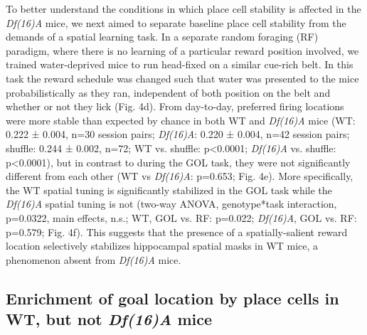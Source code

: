 To better understand the conditions in which place cell stability is affected in the \emph{Df(16)A\super{+/-}} mice, we next aimed to separate baseline place cell stability from the demands of a spatial learning task.  In a separate random foraging (RF) paradigm, where there is no learning of a particular reward position involved, we trained water-deprived mice to run head-fixed on a similar cue-rich belt. In this task the reward schedule was changed such that water was presented to the mice probabilistically as they ran, independent of both position on the belt and whether or not they lick (Fig. 4d). From day-to-day, preferred firing locations were more stable than expected by chance in both WT and \emph{Df(16)A\super{+/-}} mice (WT: 0.222 ± 0.004, n=30 session pairs; \emph{Df(16)A\super{+/-}}: 0.220 ± 0.004, n=42 session pairs; shuffle: 0.244 ± 0.002, n=72; WT vs. shuffle: p<0.0001; \emph{Df(16)A\super{+/-}} vs. shuffle: p<0.0001), but in contrast to during the GOL task, they were not significantly different from each other (WT vs \emph{Df(16)A\super{+/-}}: p=0.653; Fig. 4e). More specifically, the WT spatial tuning is significantly stabilized in the GOL task while the \emph{Df(16)A\super{+/-}} spatial tuning is not (two-way ANOVA, genotype*task interaction, p=0.0322, main effects, n.s.; WT, GOL vs. RF: p=0.022; \emph{Df(16)A\super{+/-}}, GOL vs. RF: p=0.579; Fig. 4f). This suggests that the presence of a spatially-salient reward location selectively stabilizes hippocampal spatial masks in WT mice, a phenomenon absent from \emph{Df(16)A\super{+/-}} mice.

\subsection{Enrichment of goal location by place cells in WT, but not \emph{Df(16)A\super{+/-}} mice}

